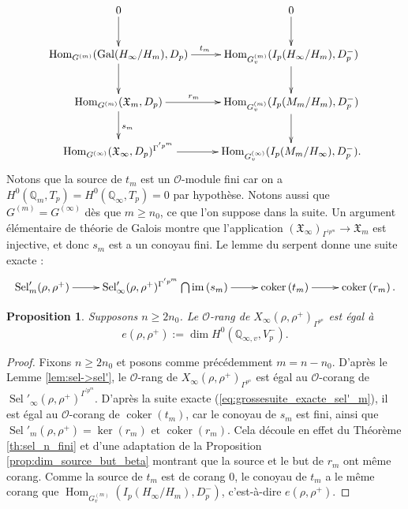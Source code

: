 \documentclass[12pt]{amsart}
\newcommand\bQ{\mathbb{Q}}
\newcommand\cO{\mathcal{O}}
\newcommand\gX{\mathfrak{X}}
\DeclareMathOperator{\Gal}{Gal}
\DeclareMathOperator{\Hom}{Hom}
\DeclareMathOperator{\im}{im}
\DeclareMathOperator{\coker}{coker}
\DeclareMathOperator{\Sel}{Sel}
\theoremstyle{defstyle}
\theoremstyle{thmstyle}
\newtheorem{proposition}[subsubsection]{Proposition}
\begin{document}
$$\xymatrix{
	0 \ar[d] 
	& 0 \ar[d] 
	\\
	\Hom_{G^{(m)}}(\Gal(H_\infty/H_m),D_p) \ar[d] \ar[r]^{t_m} 
	& \Hom_{G^{(m)}_v}(I_p(H_\infty/H_m),D_p^-) \ar[d] 
	\\
	\Hom_{G^{(m)}}(\gX_m,D_p) \ar[d]^{s_m} \ar[r]^{r_m \qquad} 
	& \Hom_{G^{(m)}_v}(I_p(M_m/H_m),D_p^-) \ar[d]
	\\ 
	\Hom_{G^{(\infty)}}(\gX_\infty,D_p)^{\Gamma^{'p^m}} \ar[r]      
	& \Hom_{G^{(\infty)}_v}(I_p(M_m/H_\infty),D_p^-).
}$$
Notons que la source de $t_m$ est un $\cO$-module fini car on a $H^0(\bQ_m,T_p)=H^0(\bQ_\infty,T_p)=0$ par hypothèse. Notons aussi que $G^{(m)}=G^{(\infty)}$ dès que $m\geq n_0$, ce que l'on suppose dans la suite. Un argument élémentaire de théorie de Galois montre que l'application $(\gX_\infty)_{\Gamma^{'p^m}} \longrightarrow \gX_m$ est injective, et donc $s_m$ est a un conoyau fini. Le lemme du serpent donne une suite exacte :
\begin{gather}
\begin{aligned}
\xymatrix{
	 \Sel'_m(\rho,\rho^+) \ar[r] & \Sel'_\infty(\rho,\rho^+)^{\Gamma^{'p^m}} \bigcap \im\left(s_m\right) \ar[r] & \coker \left(t_m\right) \ar[r] & \coker\left(r_m\right).} 
\end{aligned}
\label{eq:grossesuite_exacte_sel'_m}
\end{gather}


\begin{proposition}\label{prop:rang_coinvariants}
	Supposons $n\geq 2n_0$. Le $\cO$-rang de $X_\infty(\rho,\rho^+)_{\Gamma^{p^n}}$ est égal à 
	$$e(\rho,\rho^+):=\dim H^0(\bQ_{\infty,v},V_p^-).$$
\end{proposition}

\begin{proof}
	Fixons $n\geq 2n_0$ et posons comme précédemment $m=n-n_0$. D'après le Lemme \ref{lem:sel->sel'}, le $\cO$-rang de $X_\infty(\rho,\rho^+)_{\Gamma^{p^n}}$ est égal au $\cO$-corang de $\Sel'_\infty(\rho,\rho^+)^{\Gamma^{'p^m}}$. D'après la suite exacte (\ref{eq:grossesuite_exacte_sel'_m}), il est égal au $\cO$-corang de $\coker\left(t_m\right)$, car le conoyau de $s_m$ est fini, ainsi que $\Sel'_m(\rho,\rho^+)=\ker\left(r_m\right)$ et $\coker\left(r_m\right)$. Cela découle en effet du Théorème \ref{th:sel_n_fini} et d'une adaptation de la Proposition \ref{prop:dim_source_but_beta} montrant que la source et le but de $r_m$ ont même corang. Comme la source de $t_m$ est de corang 0, le conoyau de $t_m$ a le même corang que $\Hom_{G^{(m)}_v}(I_p(H_\infty/H_m),D_p^-)$, c'est-à-dire $e(\rho,\rho^+)$.
\end{proof}
\end{document}
